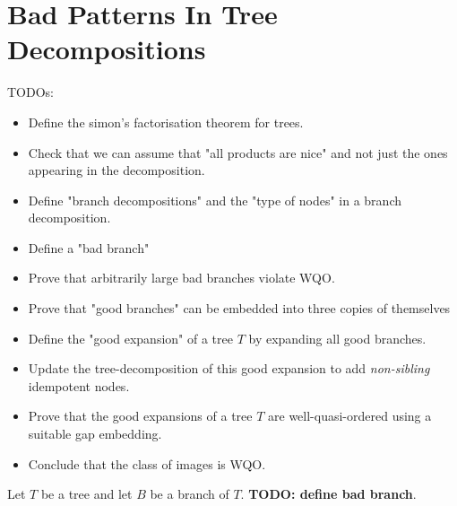 \section{Bad Patterns In Tree Decompositions}
\label{sec:bad-patterns}

TODOs:
\begin{itemize}
    \item Define the simon's factorisation theorem for trees.
    \item Check that we can assume that "all products are nice" and not just the ones
        appearing in the decomposition.
    \item Define "branch decompositions" and the "type of nodes" in a branch decomposition.
    \item Define a "bad branch"
    \item Prove that arbitrarily large bad branches violate WQO.
    \item Prove that "good branches" can be embedded into three copies of themselves
    \item Define the "good expansion" of a tree $T$ by expanding all good branches.
    \item Update the tree-decomposition of this good expansion to add \emph{non-sibling}
        idempotent nodes.
    \item Prove that the good expansions of a tree $T$ are well-quasi-ordered using a 
        suitable gap embedding.
    \item Conclude that the class of images is WQO.
\end{itemize}

\begin{definition}
    \label{def:bad-forest-branch}
    Let $T$ be a tree and let $B$ be a branch of $T$.
    \textbf{TODO: define bad branch}.
\end{definition}


